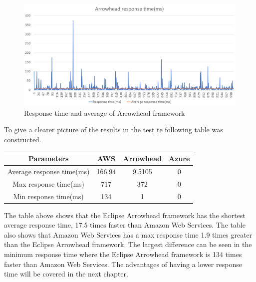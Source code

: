 \begin{figure}[h!]
    \centering
    \includegraphics[width=\textwidth]{Pictures/AH_response_time.png} 
    \caption{Response time and average of Arrowhead framework}
    \label{AH response time}
\end{figure}

To give a clearer picture of the results in the test te following table was constructed. 
\begin{center}
    \begin{tabular}{||c|c|c|c||}
        \hline
        Parameters & AWS & Arrowhead & Azure  \\
        \hline\hline
        Average response time(ms) & 166.94 & 9.5105 & 0\\
        Max response time(ms) & 717 & 372 & 0 \\
        Min response time(ms) & 134 & 1 & 0 \\
        \hline
    \end{tabular}
\end{center}
The table above shows that the Eclipse Arrowhead framework has the shortest average response time, 17.5 times faster than Amazon Web Services. 
The table also shows that Amazon Web Services has a max response time  1.9 times greater than the Eclipse Arrowhead framework.
The largest difference can be seen in the minimum response time where the Eclipse Arrowhead framework is 134 times faster than Amazon Web Services.
The advantages of having a lower response time will be covered in the next chapter.


